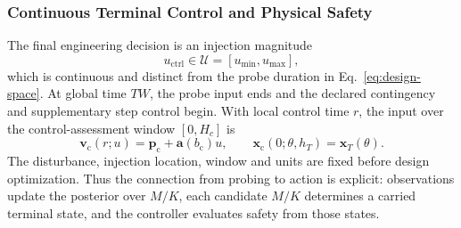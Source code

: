 \documentclass[journal]{IEEEtran}
\begin{document}
\subsubsection{Continuous Terminal Control and Physical Safety}
The final engineering decision is an injection magnitude
\begin{equation}
u_{\mathrm{ctrl}}\in\mathcal U=[u_{\min},u_{\max}],
\label{eq:control-space}
\end{equation}
which is continuous and distinct from the probe duration in
Eq.~\eqref{eq:design-space}. At global time $TW$, the probe input ends and
the declared contingency and supplementary step control begin. With local
control time $r$, the input over the control-assessment window $[0,H_c]$ is
\begin{equation}
\mathbf v_{\mathrm c}(r;u)=\mathbf p_{\mathrm c}+\mathbf a(b_{\mathrm c})u,
\qquad \mathbf x_{\mathrm c}(0;\theta,h_T)=\mathbf x_T(\theta).
\label{eq:control-input}
\end{equation}
The disturbance, injection location, window and units are fixed before design
optimization. Thus the connection from probing to action is explicit:
observations update the posterior over $M/K$, each candidate $M/K$ determines
a carried terminal state, and the controller evaluates safety from those states.
\end{document}
